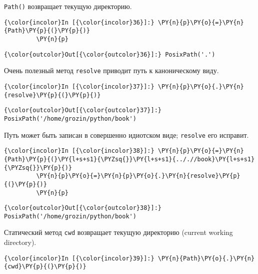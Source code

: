     \texttt{Path()} возвращает текущую директорию.

    \begin{Verbatim}[commandchars=\\\{\}]
{\color{incolor}In [{\color{incolor}36}]:} \PY{n}{p}\PY{o}{=}\PY{n}{Path}\PY{p}{(}\PY{p}{)}
         \PY{n}{p}
\end{Verbatim}

            \begin{Verbatim}[commandchars=\\\{\}]
{\color{outcolor}Out[{\color{outcolor}36}]:} PosixPath('.')
\end{Verbatim}
        
    Очень полезный метод \texttt{resolve} приводит путь к каноническому
виду.

    \begin{Verbatim}[commandchars=\\\{\}]
{\color{incolor}In [{\color{incolor}37}]:} \PY{n}{p}\PY{o}{.}\PY{n}{resolve}\PY{p}{(}\PY{p}{)}
\end{Verbatim}

            \begin{Verbatim}[commandchars=\\\{\}]
{\color{outcolor}Out[{\color{outcolor}37}]:} PosixPath('/home/grozin/python/book')
\end{Verbatim}
        
    Путь может быть записан в совершенно идиотском виде; \texttt{resolve}
его исправит.

    \begin{Verbatim}[commandchars=\\\{\}]
{\color{incolor}In [{\color{incolor}38}]:} \PY{n}{p}\PY{o}{=}\PY{n}{Path}\PY{p}{(}\PY{l+s+s1}{\PYZsq{}}\PY{l+s+s1}{.././/book}\PY{l+s+s1}{\PYZsq{}}\PY{p}{)}
         \PY{n}{p}\PY{o}{=}\PY{n}{p}\PY{o}{.}\PY{n}{resolve}\PY{p}{(}\PY{p}{)}
         \PY{n}{p}
\end{Verbatim}

            \begin{Verbatim}[commandchars=\\\{\}]
{\color{outcolor}Out[{\color{outcolor}38}]:} PosixPath('/home/grozin/python/book')
\end{Verbatim}
        
    Статический метод \texttt{cwd} возвращает текущую директорию (current
working directory).

    \begin{Verbatim}[commandchars=\\\{\}]
{\color{incolor}In [{\color{incolor}39}]:} \PY{n}{Path}\PY{o}{.}\PY{n}{cwd}\PY{p}{(}\PY{p}{)}
\end{Verbatim}

